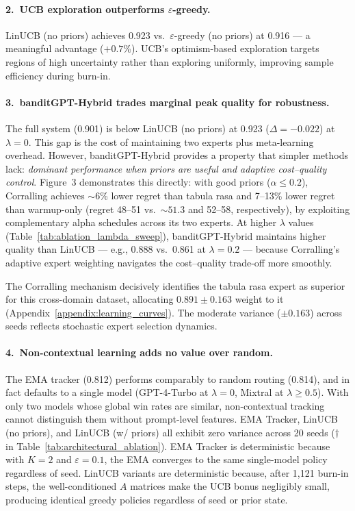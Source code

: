 \paragraph{2.\ UCB exploration outperforms $\varepsilon$-greedy.}
LinUCB (no priors) achieves 0.923 vs.\ $\varepsilon$-greedy (no priors) at
0.916 --- a meaningful advantage ($+0.7$\%).  UCB's optimism-based exploration
targets regions of high uncertainty rather than exploring uniformly,
improving sample efficiency during burn-in.

\paragraph{3.\ banditGPT-Hybrid trades marginal peak quality for robustness.}
The full system (0.901) is below LinUCB (no priors) at 0.923
($\Delta{=}-0.022$) at $\lambda{=}0$.  This gap is the cost of maintaining
two experts plus meta-learning overhead.  However, banditGPT-Hybrid provides
a property that simpler methods lack: \emph{dominant performance when priors
are useful and adaptive cost--quality control}.  Figure~3 demonstrates
this directly: with good priors ($\alpha \leq 0.2$), Corralling
achieves ${\sim}$6\% lower regret than tabula rasa and 7--13\% lower
regret than warmup-only (regret 48--51 vs.\ ${\sim}51.3$ and 52--58,
respectively), by exploiting complementary alpha schedules
across its two experts.  At higher $\lambda$ values
(Table~\ref{tab:ablation_lambda_sweep}), banditGPT-Hybrid maintains
higher quality than LinUCB --- e.g., 0.888 vs.\ 0.861 at $\lambda{=}0.2$
--- because Corralling's adaptive expert weighting navigates the
cost--quality trade-off more smoothly.

The Corralling mechanism decisively identifies the tabula rasa expert
as superior for this cross-domain dataset, allocating $0.891 \pm 0.163$
weight to it (Appendix~\ref{appendix:learning_curves}).  The moderate variance
($\pm 0.163$) across seeds reflects stochastic expert selection dynamics.

\paragraph{4.\ Non-contextual learning adds no value over random.}
The EMA tracker (0.812) performs comparably to random routing (0.814), and
in fact defaults to a single model (GPT-4-Turbo at $\lambda{=}0$, Mixtral at
$\lambda{\geq}0.5$). With only two models whose global win rates are similar,
non-contextual tracking cannot distinguish them without prompt-level features.
EMA Tracker, LinUCB (no priors), and LinUCB (w/ priors) all exhibit zero
variance across 20 seeds ($\dagger$ in Table~\ref{tab:architectural_ablation}).
EMA Tracker is deterministic because with $K{=}2$ and $\varepsilon{=}0.1$,
the EMA converges to the same single-model policy regardless of seed.
LinUCB variants are deterministic because, after 1,121 burn-in steps, the
well-conditioned $A$ matrices make the UCB bonus negligibly small,
producing identical greedy policies regardless of seed or prior state.

